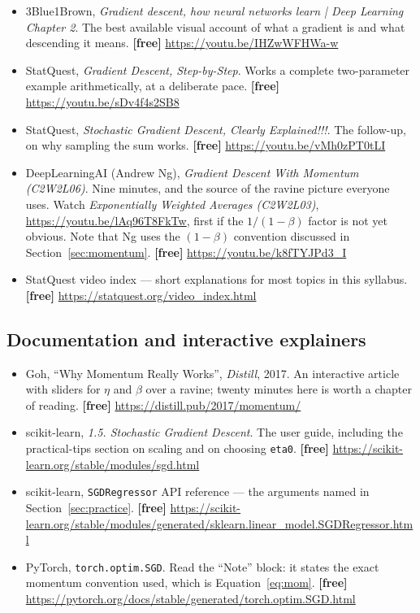 \documentclass[11pt]{article}
\begin{document}
\begin{itemize}[leftmargin=*]
  \item 3Blue1Brown, \emph{Gradient descent, how neural networks learn | Deep
    Learning Chapter 2}. The best available visual account of what a gradient
    is and what descending it means. \textbf{[free]}
    \url{https://youtu.be/IHZwWFHWa-w}
  \item StatQuest, \emph{Gradient Descent, Step-by-Step}. Works a complete
    two-parameter example arithmetically, at a deliberate pace.
    \textbf{[free]} \url{https://youtu.be/sDv4f4s2SB8}
  \item StatQuest, \emph{Stochastic Gradient Descent, Clearly Explained!!!}.
    The follow-up, on why sampling the sum works. \textbf{[free]}
    \url{https://youtu.be/vMh0zPT0tLI}
  \item DeepLearningAI (Andrew Ng), \emph{Gradient Descent With Momentum
    (C2W2L06)}. Nine minutes, and the source of the ravine picture everyone
    uses. Watch \emph{Exponentially Weighted Averages (C2W2L03)},
    \url{https://youtu.be/lAq96T8FkTw}, first if the $1/(1-\beta)$ factor is
    not yet obvious. Note that Ng uses the $(1-\beta)$ convention discussed in
    Section~\ref{sec:momentum}. \textbf{[free]}
    \url{https://youtu.be/k8fTYJPd3_I}
  \item StatQuest video index --- short explanations for most topics in this
    syllabus. \textbf{[free]} \url{https://statquest.org/video_index.html}
\end{itemize}

\subsection*{Documentation and interactive explainers}

\begin{itemize}[leftmargin=*]
  \item Goh, ``Why Momentum Really Works'', \emph{Distill}, 2017. An
    interactive article with sliders for $\eta$ and $\beta$ over a ravine;
    twenty minutes here is worth a chapter of reading. \textbf{[free]}
    \url{https://distill.pub/2017/momentum/}
  \item scikit-learn, \emph{1.5. Stochastic Gradient Descent}. The user guide,
    including the practical-tips section on scaling and on choosing
    \texttt{eta0}. \textbf{[free]}
    \url{https://scikit-learn.org/stable/modules/sgd.html}
  \item scikit-learn, \texttt{SGDRegressor} API reference --- the arguments
    named in Section~\ref{sec:practice}. \textbf{[free]}
    \url{https://scikit-learn.org/stable/modules/generated/sklearn.linear_model.SGDRegressor.html}
  \item PyTorch, \texttt{torch.optim.SGD}. Read the ``Note'' block: it states
    the exact momentum convention used, which is
    Equation~\eqref{eq:mom}. \textbf{[free]}
    \url{https://pytorch.org/docs/stable/generated/torch.optim.SGD.html}
\end{itemize}
\end{document}
